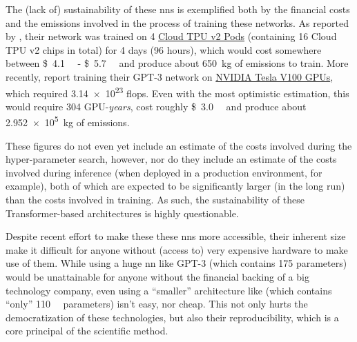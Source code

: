The (lack of) sustainability of these \glspl{nn} is exemplified both by the financial costs and the \carbon emissions involved in the process of training these networks. As reported by \citet{devlin2018bert}, their \bertbase network was trained on 4 \href{https://cloud.google.com/tpu/#cloud-tpu-offering}{Cloud TPU v2 Pods} (containing 16 Cloud TPU v2 chips in total) for 4 days (96 hours), which would cost somewhere between \SI{4.1}[\$]{\kilo\nothing} - \SI{5.7}[\$]{\kilo\nothing} and produce about \SI{650}{\kilogram} of \carbon emissions to train. \citep{lacoste2019quantifying,strubell2019energy}
More recently, \citet{brown2020language} report training their GPT-3 network on \href{https://www.nvidia.com/en-gb/data-center/tesla-v100/}{NVIDIA Tesla V100 GPUs}, which required \num{3.14e23} \gls{flops}. Even with the most optimistic estimation, this would require 304 GPU-\emph{years}, cost roughly \SI{3.0}[\$]{\mega\nothing} and produce about \SI{2.952e5}{\kilogram} of \carbon emissions.

These figures do not even yet include an estimate of the costs involved during the hyper-parameter search, however, nor do they include an estimate of the costs involved during inference (when deployed in a production environment, for example), both of which are expected to be significantly larger (in the long run) than the costs involved in training. As such, the sustainability of these Transformer-based architectures is highly questionable.

Despite recent effort to make these these \glspl{nn} more accessible, their inherent size make it difficult for anyone without (access to) very expensive hardware to make use of them. While using a huge \gls{nn} like GPT-3 (which contains \SI{175}{\billion} parameters) would be unattainable for anyone without the financial backing of a big technology company, even using a ``smaller'' architecture like \bertbase (which contains ``only'' \SI{110}{\mega\nothing} parameters) isn't easy, nor cheap. This not only hurts the democratization of these technologies, but also their reproducibility, which is a core principal of the scientific method.

